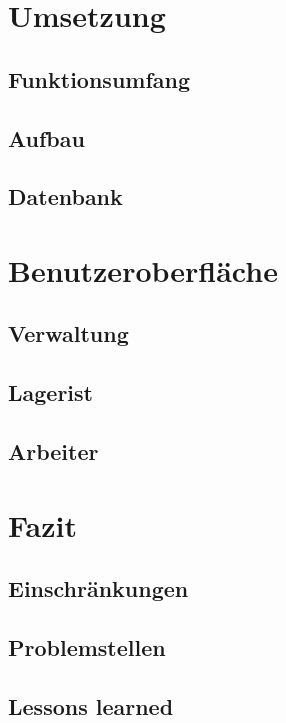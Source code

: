\documentclass[ngerman, 12pt, pdftex]{scrartcl}[2006/07/30]
\begin{document}



\section{Umsetzung}
\subsection{Funktionsumfang}


\subsection{Aufbau}


\subsection{Datenbank}



\section{Benutzeroberfläche}
\subsection{Verwaltung}

\subsection{Lagerist}



\subsection{Arbeiter}



\section{Fazit}
\subsection{Einschränkungen}

\subsection{Problemstellen}

\subsection{Lessons learned}


\end{document}
